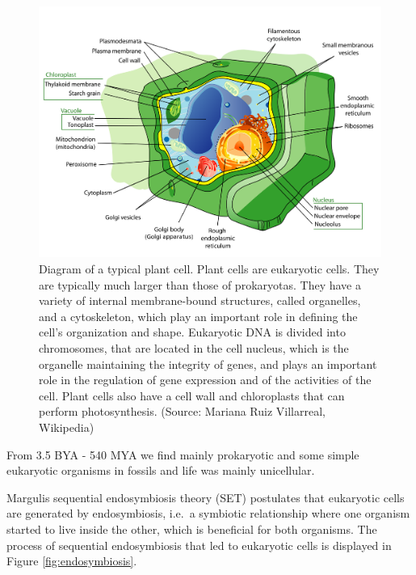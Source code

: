 \documentclass[
  11pt,
]{book}
\begin{document}
\begin{figure}

{\centering \includegraphics[width=0.5\linewidth]{./figs/plantCell} 

}

\caption{Diagram of a typical plant cell. Plant cells are eukaryotic cells. They are typically much larger than those of prokaryotas. They have a variety of internal membrane-bound structures, called organelles, and a cytoskeleton, which play an important role in defining the cell's organization and shape. Eukaryotic DNA is divided into chromosomes, that are located in the cell nucleus, which is the organelle maintaining the integrity of genes, and plays an important role in the regulation of gene expression and of the activities of the cell. Plant cells also have a cell wall and chloroplasts that can perform photosynthesis. (Source: Mariana Ruiz Villarreal, Wikipedia)}\label{fig:plantCell}
\end{figure}

From 3.5 BYA - 540 MYA we find mainly prokaryotic and some simple eukaryotic organisms in fossils and life was mainly unicellular.

Margulis sequential endosymbiosis theory (SET) postulates that eukaryotic cells are generated by endosymbiosis, i.e.~a symbiotic relationship where one organism started to live inside the other, which is beneficial for both organisms. The process of sequential endosymbiosis that led to eukaryotic cells is displayed in Figure \ref{fig:endosymbiosis}.
\end{document}
